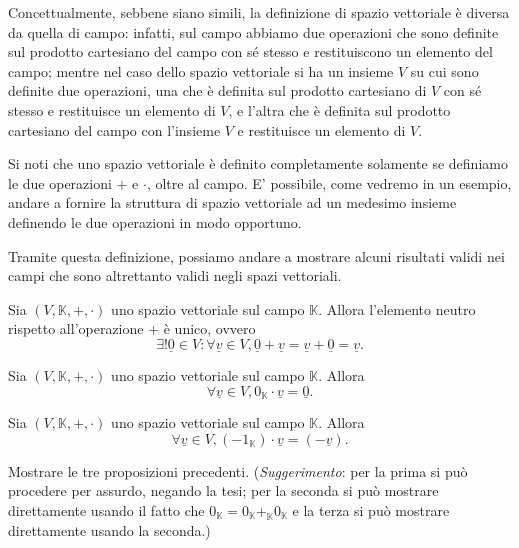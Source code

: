 \begin{remark}
    Concettualmente, sebbene siano simili, la definizione di spazio vettoriale è diversa da quella di campo: infatti, sul campo abbiamo due operazioni che sono definite sul prodotto cartesiano del campo con sé stesso e restituiscono un elemento del campo; mentre nel caso dello spazio vettoriale si ha un insieme $V$ su cui sono definite due operazioni, una che è definita sul prodotto cartesiano di $V$ con sé stesso e restituisce un elemento di $V$, e l'altra che è definita sul prodotto cartesiano del campo con l'insieme $V$ e restituisce un elemento di $V$.
\end{remark}
\begin{remark}
    Si noti che uno spazio vettoriale è definito completamente solamente se definiamo le due operazioni $+$ e $\cdot$, oltre al campo. E' possibile, come vedremo in un esempio, andare a fornire la struttura di spazio vettoriale ad un medesimo insieme definendo le due operazioni in modo opportuno.
\end{remark}
Tramite questa definizione, possiamo andare a mostrare alcuni risultati validi nei campi che sono altrettanto validi negli spazi vettoriali.
\begin{prop}
    Sia $(V, \mathbb{K}, +, \cdot)$ uno spazio vettoriale sul campo $\mathbb{K}$. Allora l'elemento neutro rispetto all'operazione $+$ è unico, ovvero
    $$
    \exists! \underline{0} \in V : \forall \underline{v} \in V, \underline{0} + \underline{v} = \underline{v} + \underline{0} = \underline{v}.
    $$
\end{prop}
\begin{prop}
    \label{prop:0v_equal_0} Sia $(V, \mathbb{K}, +, \cdot)$ uno spazio vettoriale sul campo $\mathbb{K}$. Allora
    $$
    \forall \underline{v} \in V, 0_{\mathbb{K}} \cdot \underline{v} = \underline{0}.
    $$
\end{prop}
\begin{prop}
    Sia $(V, \mathbb{K}, +, \cdot)$ uno spazio vettoriale sul campo $\mathbb{K}$. Allora
    $$
    \forall \underline{v} \in V, (-1_\mathbb{K}) \cdot \underline{v} = (-\underline{v}).
    $$
\end{prop}
\begin{exercise}
    \label{ex:1.1} Mostrare le tre proposizioni precedenti. (\emph{Suggerimento}: per la prima si può procedere per assurdo, negando la tesi; per la seconda si può mostrare direttamente usando il fatto che $0_\mathbb{K} = 0_\mathbb{K} +_\mathbb{K} 0_\mathbb{K}$ e la terza si può mostrare direttamente usando la seconda.)
\end{exercise}
